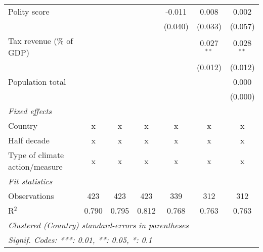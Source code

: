 \begin{tabular}{lcccccc}
   Polity score                                                &         &              &                & -0.011         & 0.008          & 0.002\\   
                                                               &         &              &                & (0.040)        & (0.033)        & (0.057)\\   
   Tax revenue (\% of GDP)                                     &         &              &                &                & 0.027$^{**}$   & 0.028$^{**}$\\   
                                                               &         &              &                &                & (0.012)        & (0.012)\\   
   Population total                                            &         &              &                &                &                & 0.000\\   
                                                               &         &              &                &                &                & (0.000)\\   
   \emph{Fixed effects}\\
   Country                                                     & x       & x            & x              & x              & x              & x\\  
   Half decade                                                 & x       & x            & x              & x              & x              & x\\  
   Type of climate action/measure                              & x       & x            & x              & x              & x              & x\\  
   \midrule \emph{Fit statistics}\\
   Observations                                                & 423     & 423          & 423            & 339            & 312            & 312\\  
   R$^2$                                                       & 0.790   & 0.795        & 0.812          & 0.768          & 0.763          & 0.763\\  
   \midrule
   \multicolumn{7}{l}{\emph{Clustered (Country) standard-errors in parentheses}}\\
   \multicolumn{7}{l}{\emph{Signif. Codes: ***: 0.01, **: 0.05, *: 0.1}}\\
\end{tabular}
\par\endgroup


